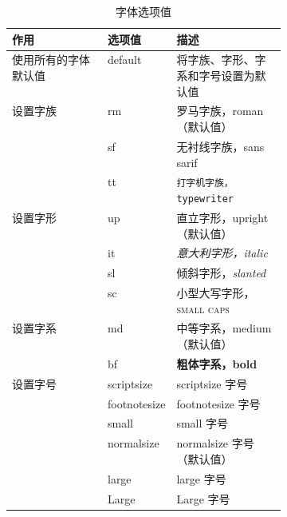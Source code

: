 \begin{table}
\centering
\caption{ 字体选项值}\label{tab:caption-fontval}
\begin{tabular}{l>{\ttfamily}lp{0.4\linewidth}}
\toprule
作用 & {\rm 选项值} & 描述 \\
\midrule
使用所有的字体默认值 & default & 将字族、字形、字系和字号设置为默认值 \\
\midrule
设置字族 & rm & \textrm{罗马字族，roman}（默认值） \\
& sf & \textsf{无衬线字族，sans sarif} \\
& tt & \texttt{打字机字族，typewriter} \\
\midrule
设置字形 & up & \textup{直立字形，upright} （默认值） \\
& it & \textit{意大利字形，italic} \\
& sl & 倾斜字形，\textsl{slanted} \\
& sc & 小型大写字形，\textsc{small caps} \\
\midrule
设置字系 & md & \textmd{中等字系，medium} （默认值） \\
& bf & \textbf{粗体字系，bold} \\
\midrule
设置字号 & scriptsize & {\scriptsize scriptsize 字号} \\
& footnotesize & {\footnotesize footnotesize 字号} \\
& small & {\small small 字号} \\
& normalsize & {\normalsize normalsize 字号} （默认值） \\
& large & {\large large 字号} \\
& Large & {\Large Large 字号}\\
\bottomrule
\end{tabular}
\end{table}


